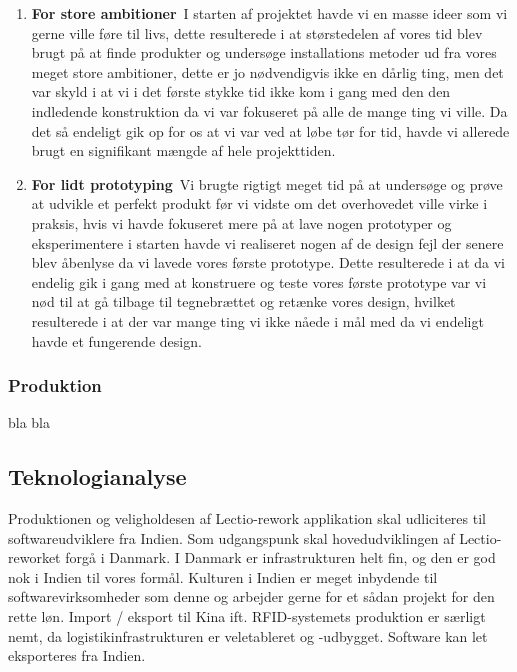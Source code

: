     \begin{enumerate}
        \item \textbf{For store ambitioner}\
            I starten af projektet havde vi en masse ideer som vi gerne ville føre til livs, dette resulterede i at størstedelen af vores tid blev
            brugt på at finde produkter og undersøge installations metoder ud fra vores meget store ambitioner, dette er jo nødvendigvis ikke en
            dårlig ting, men det var skyld i at vi i det første stykke tid ikke kom i gang med den den indledende konstruktion
            da vi var fokuseret på alle de mange ting vi ville. Da det så endeligt gik op for os at vi var ved at løbe tør for
            tid, havde vi allerede brugt en signifikant mængde af hele projekttiden.
        \item \textbf{For lidt prototyping}\
            Vi brugte rigtigt meget tid på at undersøge og prøve at udvikle et perfekt produkt før vi vidste om det overhovedet ville virke i
            praksis, hvis vi havde fokuseret mere på at lave nogen prototyper og eksperimentere i starten havde vi realiseret nogen af de
            design fejl der senere blev åbenlyse da vi lavede vores første prototype. Dette resulterede i at da vi endelig gik i gang med at
            konstruere og teste vores første prototype var vi nød til at gå tilbage til tegnebrættet og retænke vores design, hvilket
            resulterede i at der var mange ting vi ikke nåede i mål med da vi endeligt havde et fungerende design.
    \end{enumerate}
    
    \subsubsection{Produktion}
    bla bla

    \subsection{Teknologianalyse}
        Produktionen og veligholdesen af Lectio-rework applikation skal udliciteres til softwareudviklere fra Indien.
        Som udgangspunk skal hovedudviklingen af Lectio-reworket forgå i Danmark. I Danmark er infrastrukturen helt fin, og den er god nok i Indien til vores formål. Kulturen i Indien
        er meget inbydende til softwarevirksomheder som denne og arbejder gerne for et sådan projekt for den rette løn. Import / eksport til Kina ift. RFID-systemets 
        produktion er særligt nemt, da logistikinfrastrukturen er veletableret og -udbygget. Software kan let eksporteres fra Indien.
